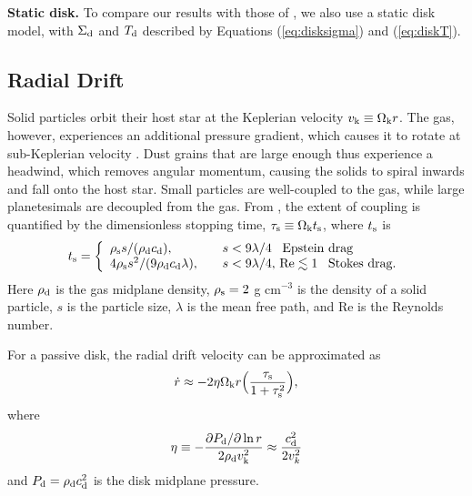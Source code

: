 \documentclass[apj]{emulateapj}
\begin{document}
\textbf{Static disk.} To compare our results with those of \citet{oberg11}, we also use a static disk model, with $\Sigma_{\rm d}$ and $T_{\rm d}$ described by Equations (\ref{eq:disksigma}) and (\ref{eq:diskT}). %


\subsection{Radial Drift}
\label{sec:drift}

Solid particles orbit their host star at the Keplerian velocity $v_{\rm k} \equiv \Omega_{\rm k} r$. The gas, however, experiences an additional pressure gradient, which causes it to rotate at sub-Keplerian velocity \citep{weidenschilling77}. Dust grains that are large enough thus experience a headwind, which removes angular momentum, causing the solids to spiral inwards and fall onto the host star. Small particles are well-coupled to the gas, while large planetesimals are decoupled from the gas. From \citet{chiang10}, the extent of coupling is quantified by the dimensionless stopping time, $\tau_{\rm s} \equiv \Omega_{\rm k} t_{\rm s}$, where $t_{\rm s}$ is
\begin{equation}
\label{eq:ts}
t_{\rm s}= \left\{
\begin{array}{l l}
\rho_{\rm s} s / (\rho_{\rm d} c_{\rm d}), & \quad s < 9 \lambda/4 \,\,\,\ \text{Epstein drag} \\
4 \rho_{\rm s} s^2 / (9 \rho_{\rm d} c_{\rm d} \lambda), & \quad s < 9 \lambda/4, \,\text{Re} \lesssim 1 \,\,\,\ \text{Stokes drag.}
\end{array} 
\right.
\end{equation}
Here $\rho_{\rm d}$ is the gas midplane density, $\rho_{\rm s}=2$ g cm$^{-3}$ is the density of a solid particle, $s$ is the particle size, $\lambda$ is the mean free path, and Re is the Reynolds number. 

For a passive disk, the radial drift velocity can be approximated as
\begin{equation}
\label{eq:rdotpas}
\dot{r} \approx -2 \eta \Omega_{\rm k} r \Big(\frac{\tau_{\rm s}}{1+\tau_{\rm s}^2}\Big),
\end{equation}
where
\begin{equation}
\label{eq:eta}
\eta \equiv - \frac{\partial P_{\rm d}/\partial \ln r}{2 \rho_{\rm d} v_{\rm k}^2} \approx \frac{c_{\rm d}^2}{2 v_k^2}
\end{equation}
and $P_{\rm d} = \rho_{\rm d} c_{\rm d}^2$ is the disk midplane pressure. 
\end{document}
